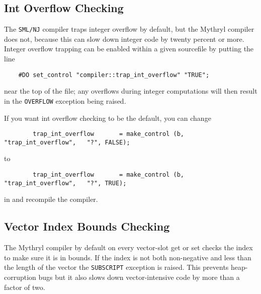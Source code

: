 \cutend*


\subsection{Int Overflow Checking}
\label{section:tut:full-monte:int-overflow-checking}

The {\tt SML/NJ} compiler traps integer overflow by default, but 
the Mythryl compiler does not, because this can slow down integer 
code by twenty percent or more.  Integer overflow trapping can be enabled 
within a given sourcefile by putting the line 

\begin{verbatim}
    #DO set_control "compiler::trap_int_overflow" "TRUE";
\end{verbatim}

near the top of the file; any overflows during integer computations 
will then result in the {\tt OVERFLOW} exception being raised. 

If you want int overflow checking to be the default, you can change 

\begin{verbatim}
        trap_int_overflow       = make_control (b, "trap_int_overflow",   "?", FALSE);
\end{verbatim}

to 

\begin{verbatim}
        trap_int_overflow       = make_control (b, "trap_int_overflow",   "?", TRUE);
\end{verbatim}

in   
and recompile the compiler.

\cutend*


\subsection{Vector Index Bounds Checking}
\label{section:tut:full-monte:vector-index-bounds-checking}

The Mythryl compiler by default on every vector-slot get or set checks the index 
to make sure it is in bounds.  If the index is not both non-negative and less 
than the length of the vector the {\tt SUBSCRIPT} exception is raised.  This 
prevents heap-corruption bugs but it also slows down vector-intensive code by 
more than a factor of two. 

